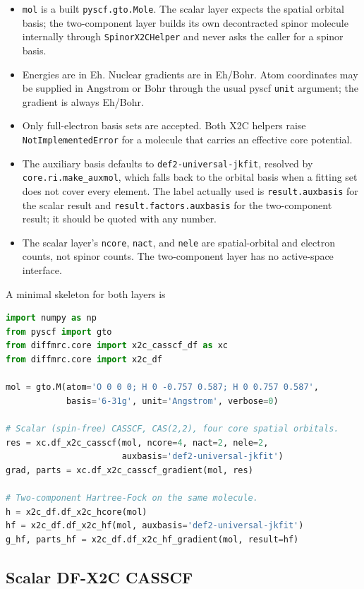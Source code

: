 \begin{itemize}
\item \texttt{mol} is a built \texttt{pyscf.gto.Mole}.  The scalar layer
  expects the spatial orbital basis; the two-component layer builds its
  own decontracted spinor molecule internally through
  \texttt{SpinorX2CHelper} and never asks the caller for a spinor
  basis.
\item Energies are in Eh.  Nuclear gradients are in Eh/Bohr.  Atom
  coordinates may be supplied in Angstrom or Bohr through the usual
  pyscf \texttt{unit} argument; the gradient is always Eh/Bohr.
\item Only full-electron basis sets are accepted.  Both X2C helpers
  raise \texttt{NotImplementedError} for a molecule that carries an
  effective core potential.
\item The auxiliary basis defaults to \texttt{def2-universal-jkfit},
  resolved by \texttt{core.ri.make\_auxmol}, which falls back to the
  orbital basis when a fitting set does not cover every element.  The
  label actually used is \texttt{result.auxbasis} for the scalar
  result and \texttt{result.factors.auxbasis} for the two-component
  result; it should be quoted with any number.
\item The scalar layer's \texttt{ncore}, \texttt{nact}, and
  \texttt{nele} are spatial-orbital and electron counts, not spinor
  counts.  The two-component layer has no active-space interface.
\end{itemize}

A minimal skeleton for both layers is
\begin{lstlisting}[language=Python]
import numpy as np
from pyscf import gto
from diffmrc.core import x2c_casscf_df as xc
from diffmrc.core import x2c_df

mol = gto.M(atom='O 0 0 0; H 0 -0.757 0.587; H 0 0.757 0.587',
            basis='6-31g', unit='Angstrom', verbose=0)

# Scalar (spin-free) CASSCF, CAS(2,2), four core spatial orbitals.
res = xc.df_x2c_casscf(mol, ncore=4, nact=2, nele=2,
                       auxbasis='def2-universal-jkfit')
grad, parts = xc.df_x2c_casscf_gradient(mol, res)

# Two-component Hartree-Fock on the same molecule.
h = x2c_df.df_x2c_hcore(mol)
hf = x2c_df.df_x2c_hf(mol, auxbasis='def2-universal-jkfit')
g_hf, parts_hf = x2c_df.df_x2c_hf_gradient(mol, result=hf)
\end{lstlisting}

\subsection{Scalar DF-X2C CASSCF}

